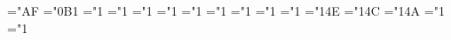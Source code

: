 { \def\bmhat{\ifnum\fam=\m@ne\mathaccent"0\mtbsy@@4F \else\@hat@\fi}%
 \def\bmdot{\ifnum\fam=\m@ne\mathaccent"0\mtbsy@@50 \else\@dot@\fi}%
 \def\bmtilde{\ifnum\fam=\m@ne\mathaccent"0\mtbsy@@51 \else\@tilde@\fi}%
 \def\bmddot{\ifnum\fam=\m@ne\mathaccent"0\mtbsy@@52 \else\@ddot@\fi}%
 \def\bmdotup{\mathaccent"0\mtbsy@@54 }%
 \def\bmddotup{\mathaccent"0\mtbsy@@55 }%
 \def\bmoacc{\mathaccent"0\mtbsy@@56 }%
 \def\bmdddot{\mathaccent"0\mtbsy@@ AB }%
 \def\bmddddot{\mathaccent"0\mtbsy@@ AC }%
 \def\bmdddotup{\mathaccent"0\mtbsy@@ AD}%
 \def\bmddddotup{\mathaccent"0\mtbsy@@ AE }%
 \mathchardef\bmhslash="\mtbsy@@ AF
 \mathchardef\bmdigamma="0\mtbsy@@ B1
 \def\bmyen{\ifmmode\mathchar"0\mtbsy@@ B0 \else\mathhexbox\mtbsy@@ B0\fi}%
 \ifx\amstexloaded@\relax
  \Makeacc@{}%
  \Makeacc@{}%
  \Makeacc@{}%
  \Makeacc@{}%
  \Makeacc@{}%
  \Makeacc@{}%
  \Makeacc@{}%
  \Makeacc@{}%
  \Makeacc@{}%
  \Makeacc@{}%
  \Makeacc@{}%
  \Makeacc@{}%
  \Makeacc@{}%
  \Makeacc@{}%
  \Makeacc@{}%
  \Makeacc@{}%
 \fi
 \def\bmwbar{\mathaccent"0\mtbsy@@78 }%
 \def\bmwwbar{\mathaccent"0\mtbsy@@53 }%
 \def\bmwhat{\mathaccent"0\mtbsy@@79 }%
 \def\bmwtilde{\mathaccent"0\mtbsy@@7A }%
 \def\bmwcheck{\mathaccent"0\mtbsy@@7B }%
 \def\bmwwhat{\mathaccent"0\mtbex@@80 }%
 \def\bmwwtilde{\mathaccent"0\mtbex@@81 }%
 \def\bmwwcheck{\mathaccent"0\mtbex@@7D }%
 \def\bmwidehat{\mathaccent"0\mtbex@@62 }%
 \def\bmwidetilde{\mathaccent"0\mtbex@@65 }%
 \def\bmwidecheck{\mathaccent"0\mtbex@@7A }%
 \ifx\amstexloaded@\relax
  \Makeacc@{}%
  \Makeacc@{}%
  \Makeacc@{}%
  \Makeacc@{}%
  \Makeacc@{}%
  \Makeacc@{}%
  \Makeacc@{}%
  \Makeacc@{}%
 \fi
 \mathchardef\bmcoprod="1
 \mathchardef\bmbigvee="1
 \mathchardef\bmbigwedge="1
 \mathchardef\bmbiguplus="1
 \mathchardef\bmbigcap="1
 \mathchardef\bmbigcup="1
 \mathchardef\bmintop="1 \def\bmint{\bmintop\nolimits}%
 \mathchardef\bmprod="1
 \mathchardef\bmsum="1
 \mathchardef\bmbigotimes="1\mtbex@@4E
 \mathchardef\bmbigoplus="1\mtbex@@4C
 \mathchardef\bmbigodot="1\mtbex@@4A
 \mathchardef\bmointop="1 \def\bmoint{\ointop\nolimits}%
 \mathchardef\bmiintop="1 \def\bmiint{\bmiintop\nolimits}%
}
